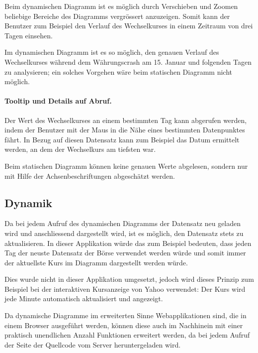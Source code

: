 Beim dynamischen Diagramm ist es möglich durch Verschieben und Zoomen beliebige Bereiche des Diagramms vergrössert anzuzeigen. Somit kann der Benutzer zum Beispiel den Verlauf des Wechselkurses in einem Zeitraum von drei Tagen einsehen.

Im dynamischen Diagramm ist es so möglich, den genauen Verlauf des Wechselkurses während dem Währungscrash am 15. Januar und folgenden Tagen zu analysieren; ein solches Vorgehen wäre beim statischen Diagramm nicht möglich.

\paragraph{Tooltip und Details auf Abruf.} 

Der Wert des Wechselkurses an einem bestimmten Tag kann abgerufen werden, indem der Benutzer mit der Maus in die Nähe eines bestimmten Datenpunktes fährt. In Bezug auf diesen Datensatz kann zum Beispiel das Datum ermittelt werden, an dem der Wechselkurs am tiefsten war.

Beim statischen Diagramm können keine genauen Werte abgelesen, sondern nur mit Hilfe der Achsenbeschriftungen abgeschätzt werden.

\subsection{Dynamik}

Da bei jedem Aufruf des dynamischen Diagramms der Datensatz neu geladen wird und anschliessend dargestellt wird, ist es möglich, den Datensatz stets zu aktualisieren. In dieser Applikation würde das zum Beispiel bedeuten, dass jeden Tag der neuste Datensatz der Börse verwendet werden würde und somit immer der aktuellste Kurs im Diagramm dargestellt werden würde.

Dies wurde nicht in dieser Applikation umgesetzt, jedoch wird dieses Prinzip zum Beispiel bei der interaktiven Kursanzeige von Yahoo \cite{yahoo} verwendet: Der Kurs wird jede Minute automatisch aktualisiert und angezeigt.

Da dynamische Diagramme im erweiterten Sinne Webapplikationen sind, die in einem Browser ausgeführt werden, können diese auch im Nachhinein mit einer praktisch unendlichen Anzahl Funktionen erweitert werden, da bei jedem Aufruf der Seite der Quellcode vom Server heruntergeladen wird.